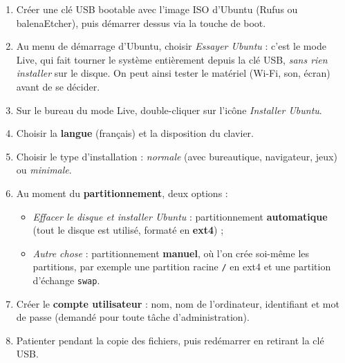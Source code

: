 \documentclass[11pt]{article}
\newcommand{\cle}[1]{{\popxbold\color{popdark}#1}}
\begin{document}
\begin{methode}
\begin{enumerate}
\item Créer une clé USB bootable avec l'image ISO d'Ubuntu (Rufus ou balenaEtcher), puis démarrer dessus via la touche de boot.
\item Au menu de démarrage d'Ubuntu, choisir \emph{Essayer Ubuntu} : c'est le \cle{mode Live}, qui fait tourner le système entièrement depuis la clé USB, \emph{sans rien installer} sur le disque. On peut ainsi tester le matériel (Wi-Fi, son, écran) avant de se décider.
\item Sur le bureau du mode Live, double-cliquer sur l'icône \emph{Installer Ubuntu}.
\item Choisir la \textbf{langue} (français) et la disposition du clavier.
\item Choisir le type d'installation : \emph{normale} (avec bureautique, navigateur, jeux) ou \emph{minimale}.
\item Au moment du \textbf{partitionnement}, deux options :
\begin{itemize}
\item \emph{Effacer le disque et installer Ubuntu} : partitionnement \textbf{automatique} (tout le disque est utilisé, formaté en \textbf{ext4}) ;
\item \emph{Autre chose} : partitionnement \textbf{manuel}, où l'on crée soi-même les partitions, par exemple une partition racine \texttt{/} en ext4 et une partition d'échange \texttt{swap}.
\end{itemize}
\item Créer le \textbf{compte utilisateur} : nom, nom de l'ordinateur, identifiant et mot de passe (demandé pour toute tâche d'administration).
\item Patienter pendant la copie des fichiers, puis redémarrer en retirant la clé USB.
\end{enumerate}
\end{methode}
\end{document}
